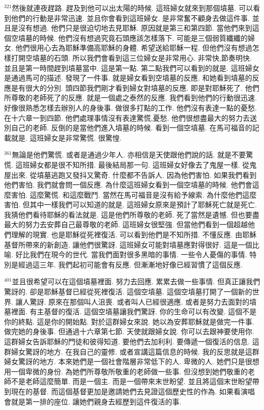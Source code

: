 \documentclass{book}
\begin{document}
$^{321}$然後就連夜趕路.
趕及到他可以出太陽的時候.
這班婦女就來到那個墳墓.
可以看到他們的行動是非常迅速.
並且你會看到這班婦女.
是非常奮不顧身去做這件事.
並且是沒有想過.
他們只是很迫切地去見耶穌.
原因就是第三和第四節.
當他們來到這個空墳墓的時候.
他們沒有想過究竟石頭應該怎樣落下.
可能是三個弱質纖纖的婦女.
他們很用心去為耶穌準備高耶穌的身體.
希望送給耶穌一程.
但他們沒有想過怎樣打開空墳墓的石頭.
所以我們會看到這三位婦女是非常用心.
非常快,節奏明快.
並且是第一時間趕到墳墓當中.
這是第一點.
第二點我們可以看到的就是.
這班婦女是通過馬可的描述.
發現了一件事.
就是婦女看到空墳墓的反應.
和她看到墳墓的反應是有很大的分別.
頭四節我們剛才看到婦女對墳墓的反應.
即是對耶穌死了.
他們所尊敬的老師死了的反應.
就是一個處之泰然的反應.
我們看到他們的行動很迅速.
好像很熟悉怎樣去辦別人的身後事.
做很多打點的工作.
他們沒有表達一點的憂愁.
在十六章一到四節.
他們處理事情沒有表達驚慌,憂愁.
他們很想盡最大的努力去送別自己的老師.
反倒的是當他們進入墳墓的時候.
看到一個空墳墓.
在馬可福音的記載就是.
這班婦女是非常驚慌.
很驚惶.

$^{361}$無論是他們驚慌.
或者是通過少年人.
亦相信是天使跟他們說的話.
就是不要驚慌.
這班婦女都是很不知所措.
最後結局那一句.
這班婦女好像去了鬼屋一樣.
從鬼屋出來.
從墳墓逃跑又發抖又驚奇.
什麼都不告訴人.
因為他們害怕.
如果我們看到他們害怕.
我們就會問一個反應.
為什麼這班婦女看到一個空墳墓的時候.
他們會這麼害怕.
這麼驚慌.
和這麼戰鬥.
當然在馬可福音是沒有給予線索.
為什麼他們這麼害怕.
但其中一樣我們可以知道的就是.
這班婦女原來是預計了耶穌死亡就是死亡.
我猜他們看待耶穌的看法就是.
這是他們所尊敬的老師.
死了當然是遺憾.
但也要盡最大的努力去安葬自己最尊敬的老師.
這班婦女很堅強.
但當他們看到一個超越他們理解的現實.
也是耶穌從死裡復活.
可以看到他們是不知所措.
不懂反應.
由耶穌基督所帶來的新創造.
讓他們很驚訝.
這班婦女可能對墳墓應對得很好.
這是一個比喻.
好比我們在現今的世代.
當我們面對很多黑暗的事情.
一些令人憂傷的事情.
特別是經過這三年.
我們起初可能會有反應.
但漸漸地好像已經習慣了這個反應.

$^{401}$並且很希望可以在這個墳墓裡面.
努力去回應.
累累去做一些事情.
但真正讓我們驚訝的.
卻是耶穌基督已經從死裡復活.
這個空墳墓.
這個空墳墓打開了一個新的世界.
讓人驚訝.
原來在那個叫人沮喪.
或者叫人已經很適應.
或者是努力去面對的墳墓裡面.
有主基督的復活.
這個空墳墓讓我們驚訝.
你的生命可以有改變.
這個不是你的終點.
這是你的開始點.
對於這群婦女來說.
她以為安葬耶穌就是做完一件事.
做完她的身後事.
但通過十六章第七節.
天使就跟婦女說.
你可以去跟神要使用你.
這群婦女告訴耶穌的門徒和彼得知道.
要他們去加利利.
要傳遞一個復活的信息.
這群婦女驚訝的地方.
在我自己的靈修.
或者宣講這篇信息的時候.
我的反思就是這群婦女驚訝的地方.
本來她們是一個社會階層非常低下的人.
卑微的人.
她們只是很想用一個卑微的身份.
為她們所尊敬所敬重的老師做一些事.
但沒想到她們敬重的老師不是老師這麼簡單.
而是一個主.
而是一個帶來末世盼望.
並且將這個末世盼望帶到現在的基督.
而這個基督更加是邀請她們去見證這個歷史性的作為.
如果看演唱會就是第一排的座位.
讓她們親身去經歷到這件復活的事.
\end{document}
